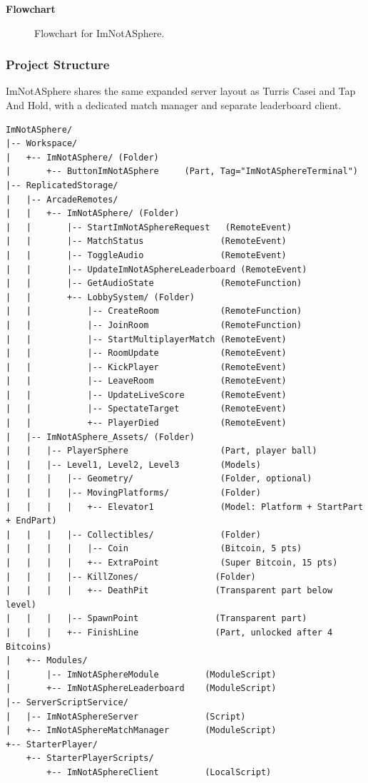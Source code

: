 \documentclass[12pt,letterpaper]{article}
\begin{document}
\textbf{Flowchart}
\begin{figure}[H]
  \centering
  
  \caption{Flowchart for ImNotASphere.}
  \label{fig:imnotasphere_flow}
\end{figure}

\subsubsection{Project Structure}

ImNotASphere shares the same expanded server layout as Turris Casei and Tap And Hold, with a dedicated match manager and separate leaderboard client.

\begin{lstlisting}
ImNotASphere/
|-- Workspace/
|   +-- ImNotASphere/ (Folder)
|       +-- ButtonImNotASphere     (Part, Tag="ImNotASphereTerminal")
|-- ReplicatedStorage/
|   |-- ArcadeRemotes/
|   |   +-- ImNotASphere/ (Folder)
|   |       |-- StartImNotASphereRequest   (RemoteEvent)
|   |       |-- MatchStatus               (RemoteEvent)
|   |       |-- ToggleAudio               (RemoteEvent)
|   |       |-- UpdateImNotASphereLeaderboard (RemoteEvent)
|   |       |-- GetAudioState             (RemoteFunction)
|   |       +-- LobbySystem/ (Folder)
|   |           |-- CreateRoom            (RemoteFunction)
|   |           |-- JoinRoom              (RemoteFunction)
|   |           |-- StartMultiplayerMatch (RemoteEvent)
|   |           |-- RoomUpdate            (RemoteEvent)
|   |           |-- KickPlayer            (RemoteEvent)
|   |           |-- LeaveRoom             (RemoteEvent)
|   |           |-- UpdateLiveScore       (RemoteEvent)
|   |           |-- SpectateTarget        (RemoteEvent)
|   |           +-- PlayerDied            (RemoteEvent)
|   |-- ImNotASphere_Assets/ (Folder)
|   |   |-- PlayerSphere                  (Part, player ball)
|   |   |-- Level1, Level2, Level3        (Models)
|   |   |   |-- Geometry/                 (Folder, optional)
|   |   |   |-- MovingPlatforms/          (Folder)
|   |   |   |   +-- Elevator1             (Model: Platform + StartPart + EndPart)
|   |   |   |-- Collectibles/             (Folder)
|   |   |   |   |-- Coin                  (Bitcoin, 5 pts)
|   |   |   |   +-- ExtraPoint            (Super Bitcoin, 15 pts)
|   |   |   |-- KillZones/               (Folder)
|   |   |   |   +-- DeathPit             (Transparent part below level)
|   |   |   |-- SpawnPoint               (Transparent part)
|   |   |   +-- FinishLine               (Part, unlocked after 4 Bitcoins)
|   +-- Modules/
|       |-- ImNotASphereModule         (ModuleScript)
|       +-- ImNotASphereLeaderboard    (ModuleScript)
|-- ServerScriptService/
|   |-- ImNotASphereServer             (Script)
|   +-- ImNotASphereMatchManager       (ModuleScript)
+-- StarterPlayer/
    +-- StarterPlayerScripts/
        +-- ImNotASphereClient         (LocalScript)
\end{lstlisting}
\end{document}
